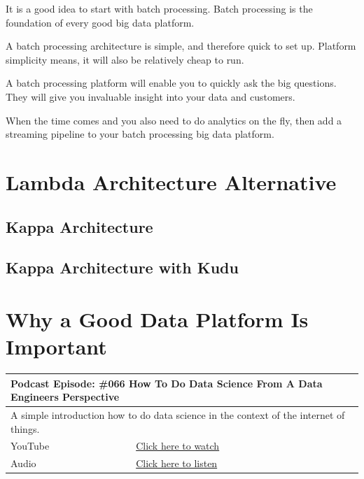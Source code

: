 \documentclass[12pt, numbers=noenddot]{scrreprt} %
\begin{document}
It is a good idea to start with batch processing. Batch processing is the foundation of every good big data platform.

A batch processing architecture is simple, and therefore quick to set up. Platform simplicity means, it will also be relatively cheap to run.

A batch processing platform will enable you to quickly ask the big questions. They will give you invaluable insight into your data and customers.

When the time comes and you also need to do analytics on the fly, then add a streaming pipeline to your batch processing big data platform.


\section{Lambda Architecture Alternative }
\subsection{Kappa Architecture}
\subsection{Kappa Architecture with Kudu}

\section{Why a Good Data Platform Is Important}

\begin{table}[h]
\begin{tabular}{ll}
\hline
\multicolumn{2}{l}{\textbf{Podcast Episode:} \#066 How To Do Data Science From A Data Engineers Perspective} \\ \hline
\multicolumn{2}{p{15cm}}{A simple introduction how to do data science in the context of the internet of things.}         \\ \hline
\multicolumn{1}{l|}{YouTube}   & \href{https://youtu.be/yp_cc4R0mGQ}{Click here to watch}   \\
\multicolumn{1}{l|}{Audio}     & \href{https://anchor.fm/andreaskayy/episodes/066-How-To-Do-Data-Science-From-A-Data-Engineers-Perspective-e45imt}{Click here to listen}   \\ \hline
\end{tabular}
\end{table}
\end{document}
